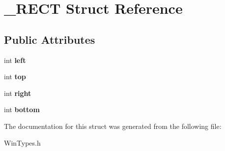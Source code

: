 \hypertarget{struct__RECT}{\section{\-\_\-\-R\-E\-C\-T Struct Reference}
\label{struct__RECT}
}
\subsection*{Public Attributes}
\begin{DoxyCompactItemize}
\item 
\hypertarget{struct__RECT_a3a9399436a3006565deb0a776d349932}{int {\bfseries left}}\label{struct__RECT_a3a9399436a3006565deb0a776d349932}

\item 
\hypertarget{struct__RECT_a5145f9f0e679f3de30cb0d9041c489d9}{int {\bfseries top}}\label{struct__RECT_a5145f9f0e679f3de30cb0d9041c489d9}

\item 
\hypertarget{struct__RECT_a278eed91f58e467d2a4f479ceea96901}{int {\bfseries right}}\label{struct__RECT_a278eed91f58e467d2a4f479ceea96901}

\item 
\hypertarget{struct__RECT_a3d39b058df256b33791fea5c5c5b25db}{int {\bfseries bottom}}\label{struct__RECT_a3d39b058df256b33791fea5c5c5b25db}

\end{DoxyCompactItemize}


The documentation for this struct was generated from the following file\-:\begin{DoxyCompactItemize}
\item 
Win\-Types.\-h\end{DoxyCompactItemize}
